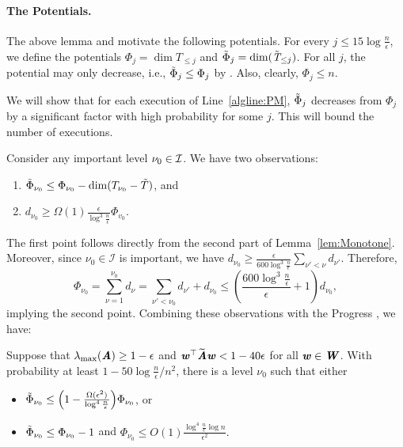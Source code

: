 \paragraph{The Potentials.}
The above lemma and  motivate the following potentials.
For every $j\le15\log\frac{n}{\epsilon}$, we define the potentials $\Phi_{j}=\dim{T_{\le j}}$ and $\tilde{\Phi}_{j}=\dim{\Ttil_{\le j}}$. For all $j$, the potential may only decrease, i.e., $\Phitil_{j}\le\Phi_{j}$ by . Also, clearly, $\Phi_{j}\le n$. 

We will show that for each execution of Line~\ref{algline:PM}, $\Phitil_{j}$ decreases from $\Phi_j$ by a significant factor with high probability for some $j$. This will bound the number of executions.

Consider any important level $\nu_{0} \in \cal{I}$. We have two observations:
\begin{enumerate}
	\item \label{enu:phi 1} $\Phitil_{\nu_{0}}\leq\Phi_{\nu_{0}}-\dim{T_{\nu_{0}}-\tilde{T}}$, and 
	\item \label{enu:phi 2} $d_{\nu_{0}}\geq\Omega(1)\frac{\epsilon}{\log^{3}\frac{n}{\epsilon}}\Phi_{v_{0}}$. 
\end{enumerate}
The first point follows directly from the second part of Lemma~\ref{lem:Monotone}. Moreover, since $\nu_{0}\in\mathcal{I}$ is important, we have $d_{\nu_{0}}\geq\frac{\epsilon}{600\log^{3}\frac{n}{\epsilon}}\sum_{\nu'<\nu}d_{\nu'}.$ Therefore, 
\[
\Phi_{\nu_{0}}=\sum_{\nu=1}^{\nu_{0}}d_{\nu}=\sum_{\nu'<\nu_{0}}d_{\nu'}+d_{\nu_{0}}\leq\left(\frac{600\log^{3}\frac{n}{\epsilon}}{\epsilon}+1\right)d_{\nu_{0}},
\]
implying the second point. 
%
Combining these observations with the Progress , we have:
\begin{lemma}
	\label{claim:potential decrease}Suppose that $\lambda_{\max}(\AA)\ge1-\epsilon$ and $\ww^{\top}\AAtil\ww<1-40\epsilon$ for all $\ww\in\WW$. With probability at least $1-50\log\frac{n}{\epsilon}/n^{2}$, there is a level $\nu_{0}$ such that either 
	\begin{itemize}
		\item $\Phitil_{\nu_{0}}\le\left(1-\frac{\Omega(\epsilon^{2})}{\log^{4}\frac{n}{\epsilon}}\right)\Phi_{\nu_{0}}$, or 
		\item $\Phitil_{\nu_{0}}\le\Phi_{\nu_{0}}-1$ and $\Phi_{\nu_{0}}\leq O(1)\frac{\log^{4}\frac{n}{\epsilon}\log n}{\epsilon^{2}}.$
	\end{itemize}
\end{lemma}

